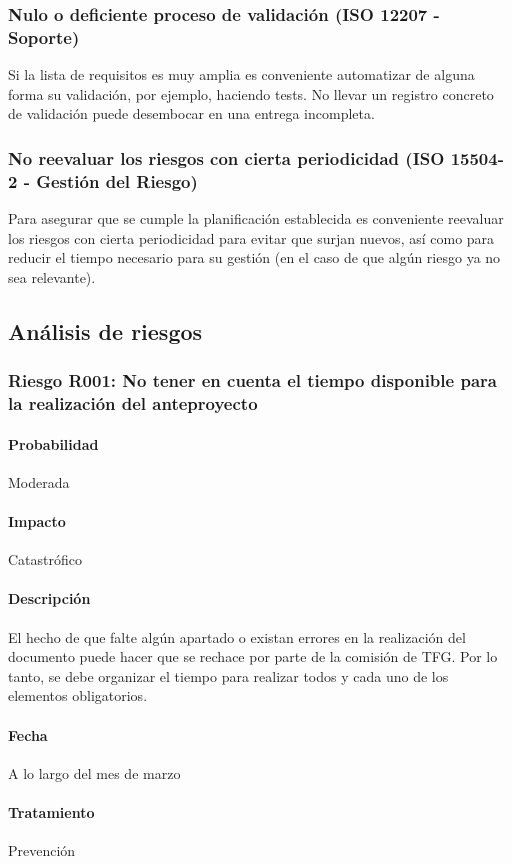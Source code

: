 \documentclass[10pt,a4paper]{article}
\begin{document}
			\subsubsection{Nulo o deficiente proceso de validación (ISO 12207 - Soporte)}
			Si la lista de requisitos es muy amplia es conveniente automatizar de alguna forma su validación, por ejemplo, haciendo tests. 
No llevar un registro concreto de validación puede desembocar en una entrega incompleta.
			\subsubsection{No reevaluar los riesgos con cierta periodicidad (ISO 15504-2 - Gestión del Riesgo)}
			Para asegurar que se cumple la planificación establecida es conveniente reevaluar los riesgos con cierta periodicidad para evitar que surjan nuevos, así como para reducir el tiempo necesario para su gestión (en el caso de que algún riesgo ya no sea relevante).
		\subsection{Análisis de riesgos}
			\subsubsection{Riesgo R001: No tener en cuenta el tiempo disponible para la realización del anteproyecto}
				\paragraph{Probabilidad} Moderada
				\paragraph{Impacto}	Catastrófico
				\paragraph{Descripción} El hecho de que falte algún apartado o existan errores en la realización del documento puede hacer que se rechace por parte de la comisión de TFG. Por lo tanto, se debe organizar el tiempo para realizar todos y cada uno de los elementos obligatorios.
				\paragraph{Fecha} A lo largo del mes de marzo %
				\paragraph{Tratamiento} Prevención %
\end{document}
